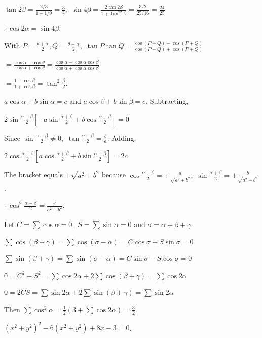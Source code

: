   $\tan2\beta = \frac{2/3}{1 - 1/9} = \frac{3}{4},$ $\sin4\beta = \frac{2\tan2\beta}{1 + \tan^22\beta} = \frac{3/2}{25/16} =
  \frac{24}{25}$

  $\therefore \cos2\alpha = \sin4\beta$.

\item With $P = \frac{\theta + \alpha}{2}, Q = \frac{\theta - \alpha}{2},$ $\tan P\tan Q = \frac{\cos(P - Q) - \cos(P +
  Q)}{\cos(P - Q) + \cos(P + Q)}$

  $= \frac{\cos\alpha - \cos\theta}{\cos\alpha + \cos\theta} = \frac{\cos\alpha - \cos\alpha\cos\beta}{\cos\alpha +
  \cos\alpha\cos\beta}$

  $= \frac{1 - \cos\beta}{1 + \cos\beta} = \tan^2\frac{\beta}{2}$.

\item $a\cos\alpha + b\sin\alpha = c$ and $a\cos\beta + b\sin\beta = c$. Subtracting,

  $2\sin\frac{\alpha - \beta}{2}\left[-a\sin\frac{\alpha + \beta}{2} + b\cos\frac{\alpha + \beta}{2}\right] = 0$

  Since $\sin\frac{\alpha - \beta}{2} \neq 0,$ $\tan\frac{\alpha + \beta}{2} = \frac{b}{a}$. Adding,

  $2\cos\frac{\alpha - \beta}{2}\left[a\cos\frac{\alpha + \beta}{2} + b\sin\frac{\alpha + \beta}{2}\right] = 2c$

  The bracket equals $\pm\sqrt{a^2 + b^2}$ because $\cos\frac{\alpha + \beta}{2} = \pm\frac{a}{\sqrt{a^2 + b^2}},$
  $\sin\frac{\alpha + \beta}{2} = \pm\frac{b}{\sqrt{a^2 + b^2}}$.

  $\therefore \cos^2\frac{\alpha - \beta}{2} = \frac{c^2}{a^2 + b^2}$.

\item Let $C = \sum\cos\alpha = 0,$ $S = \sum\sin\alpha = 0$ and $\sigma = \alpha + \beta + \gamma$.

  $\sum\cos(\beta + \gamma) = \sum\cos(\sigma - \alpha) = C\cos\sigma + S\sin\sigma = 0$

  $\sum\sin(\beta + \gamma) = \sum\sin(\sigma - \alpha) = C\sin\sigma - S\cos\sigma = 0$

  $0 = C^2 - S^2 = \sum\cos2\alpha + 2\sum\cos(\beta + \gamma) = \sum\cos2\alpha$

  $0 = 2CS = \sum\sin2\alpha + 2\sum\sin(\beta + \gamma) = \sum\sin2\alpha$

  Then $\sum\cos^2\alpha = \frac{1}{2}\left(3 + \sum\cos2\alpha\right) = \frac{3}{2}$.

\item $(x^2 + y^2)^2 - 6(x^2 + y^2) + 8x - 3 = 0$.

